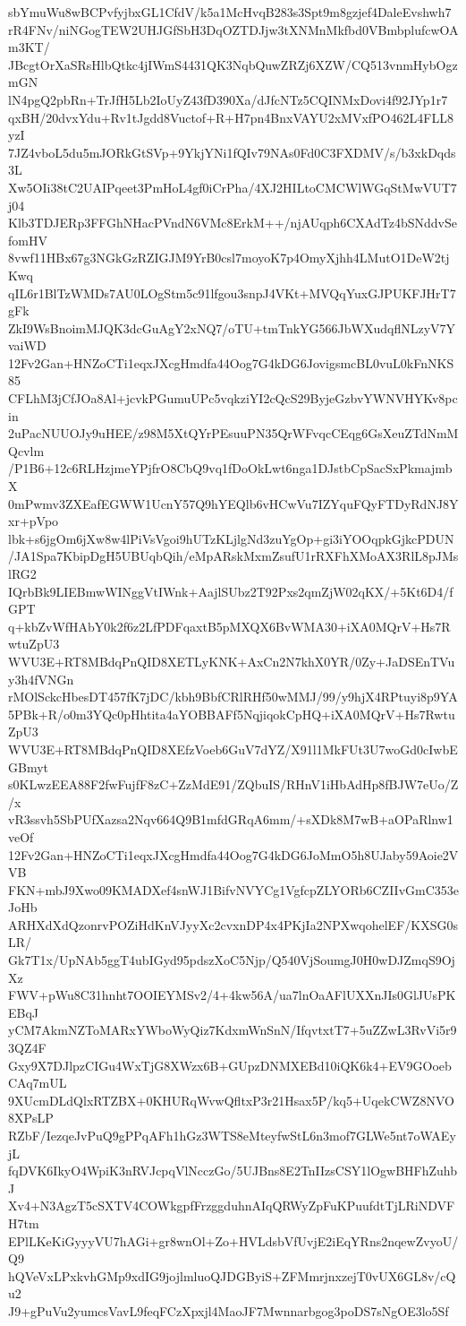sbYmuWu8wBCPvfyjbxGL1CfdV/k5a1McHvqB283s3Spt9m8gzjef4DaleEvshwh7
rR4FNv/niNGogTEW2UHJGfSbH3DqOZTDJjw3tXNMnMkfbd0VBmbplufcwOAm3KT/
JBcgtOrXaSRsHlbQtkc4jIWmS4431QK3NqbQuwZRZj6XZW/CQ513vnmHybOgzmGN
lN4pgQ2pbRn+TrJfH5Lb2IoUyZ43fD390Xa/dJfcNTz5CQINMxDovi4f92JYp1r7
qxBH/20dvxYdu+Rv1tJgdd8Vuctof+R+H7pn4BnxVAYU2xMVxfPO462L4FLL8yzI
7JZ4vboL5du5mJORkGtSVp+9YkjYNi1fQIv79NAs0Fd0C3FXDMV/s/b3xkDqds3L
Xw5OIi38tC2UAIPqeet3PmHoL4gf0iCrPha/4XJ2HILtoCMCWlWGqStMwVUT7j04
Klb3TDJERp3FFGhNHacPVndN6VMc8ErkM++/njAUqph6CXAdTz4bSNddvSefomHV
8vwf11HBx67g3NGkGzRZIGJM9YrB0csl7moyoK7p4OmyXjhh4LMutO1DeW2tjKwq
qIL6r1BlTzWMDs7AU0LOgStm5c91lfgou3snpJ4VKt+MVQqYuxGJPUKFJHrT7gFk
ZkI9WsBnoimMJQK3dcGuAgY2xNQ7/oTU+tmTnkYG566JbWXudqflNLzyV7YvaiWD
12Fv2Gan+HNZoCTi1eqxJXcgHmdfa44Oog7G4kDG6JovigsmcBL0vuL0kFnNKS85
CFLhM3jCfJOa8Al+jcvkPGumuUPc5vqkziYI2cQcS29ByjeGzbvYWNVHYKv8pcin
2uPacNUUOJy9uHEE/z98M5XtQYrPEsuuPN35QrWFvqcCEqg6GsXeuZTdNmMQcvlm
/P1B6+12c6RLHzjmeYPjfrO8CbQ9vq1fDoOkLwt6nga1DJstbCpSacSxPkmajmbX
0mPwmv3ZXEafEGWW1UcnY57Q9hYEQlb6vHCwVu7IZYquFQyFTDyRdNJ8Yxr+pVpo
lbk+s6jgOm6jXw8w4lPiVsVgoi9hUTzKLjlgNd3zuYgOp+gi3iYOOqpkGjkcPDUN
/JA1Spa7KbipDgH5UBUqbQih/eMpARskMxmZsufU1rRXFhXMoAX3RlL8pJMslRG2
IQrbBk9LIEBmwWINggVtIWnk+AajlSUbz2T92Pxs2qmZjW02qKX/+5Kt6D4/fGPT
q+kbZvWfHAbY0k2f6z2LfPDFqaxtB5pMXQX6BvWMA30+iXA0MQrV+Hs7RwtuZpU3
WVU3E+RT8MBdqPnQID8XETLyKNK+AxCn2N7khX0YR/0Zy+JaDSEnTVuy3h4fVNGn
rMOlSckcHbesDT457fK7jDC/kbh9BbfCRlRHf50wMMJ/99/y9hjX4RPtuyi8p9YA
5PBk+R/o0m3YQc0pHhtita4aYOBBAFf5NqjiqokCpHQ+iXA0MQrV+Hs7RwtuZpU3
WVU3E+RT8MBdqPnQID8XEfzVoeb6GuV7dYZ/X91l1MkFUt3U7woGd0cIwbEGBmyt
s0KLwzEEA88F2fwFujfF8zC+ZzMdE91/ZQbuIS/RHnV1iHbAdHp8fBJW7eUo/Z/x
vR3ssvh5SbPUfXazsa2Nqv664Q9B1mfdGRqA6mm/+sXDk8M7wB+aOPaRlnw1veOf
12Fv2Gan+HNZoCTi1eqxJXcgHmdfa44Oog7G4kDG6JoMmO5h8UJaby59Aoie2VVB
FKN+mbJ9Xwo09KMADXef4snWJ1BifvNVYCg1VgfcpZLYORb6CZIIvGmC353eJoHb
ARHXdXdQzonrvPOZiHdKnVJyyXc2cvxnDP4x4PKjIa2NPXwqohelEF/KXSG0sLR/
Gk7T1x/UpNAb5ggT4ubIGyd95pdszXoC5Njp/Q540VjSoumgJ0H0wDJZmqS9OjXz
FWV+pWu8C31hnht7OOIEYMSv2/4+4kw56A/ua7lnOaAFlUXXnJIs0GlJUsPKEBqJ
yCM7AkmNZToMARxYWboWyQiz7KdxmWnSnN/IfqvtxtT7+5uZZwL3RvVi5r93QZ4F
Gxy9X7DJlpzCIGu4WxTjG8XWzx6B+GUpzDNMXEBd10iQK6k4+EV9GOoebCAq7mUL
9XUcmDLdQlxRTZBX+0KHURqWvwQfltxP3r21Hsax5P/kq5+UqekCWZ8NVO8XPsLP
RZbF/IezqeJvPuQ9gPPqAFh1hGz3WTS8eMteyfwStL6n3mof7GLWe5nt7oWAEyjL
fqDVK6IkyO4WpiK3nRVJcpqVlNcczGo/5UJBns8E2TnIIzsCSY1lOgwBHFhZuhbJ
Xv4+N3AgzT5cSXTV4COWkgpfFrzggduhnAIqQRWyZpFuKPuufdtTjLRiNDVFH7tm
EPlLKeKiGyyyVU7hAGi+gr8wnOl+Zo+HVLdsbVfUvjE2iEqYRns2nqewZvyoU/Q9
hQVeVxLPxkvhGMp9xdIG9jojlmluoQJDGByiS+ZFMmrjnxzejT0vUX6GL8v/cQu2
J9+gPuVu2yumcsVavL9feqFCzXpxjl4MaoJF7Mwnnarbgog3poDS7sNgOE3lo5Sf
